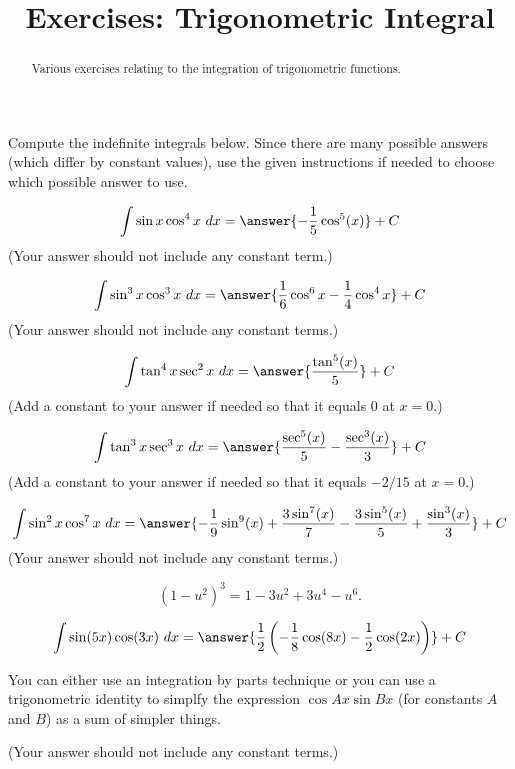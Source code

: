 \documentclass{ximera}
\title{Exercises: Trigonometric Integral}
\begin{document}
\begin{abstract}
Various exercises relating to the integration of trigonometric functions.
\end{abstract}
\maketitle


Compute the indefinite integrals below. Since there are many possible answers (which differ by constant values), use the given instructions if needed to choose which possible answer to use.

\begin{exercise}%
\[  \int \sin x\cos^4x\ dx = \answer{-\frac{1}{5} \cos ^5(x)}+C\]
(Your answer should not include any constant term.)
%
%
\end{exercise}

\begin{exercise}%
\[ \int \sin^3 x\cos^3 x\ dx = \answer{\frac{1}{6}\cos^6x-\frac{1}{4}\cos^4x}+C\]
(Your answer should not include any constant terms.)
%
%
\end{exercise}

\begin{exercise}%
\[ \int \tan^4x\sec^2x\ dx = \answer{\frac{\tan ^5(x)}{5}}+ C\]
(Add a constant to your answer if needed so that it equals $0$ at $x = 0$.)
%
%
\end{exercise}

\begin{exercise}%
\[ \int \tan^3x\sec^3x\ dx = \answer{\frac{\sec ^5(x)}{5}-\frac{\sec ^3(x)}{3}}+ C\]
(Add a constant to your answer if needed so that it equals $-2/15$ at $x = 0$.)
%
%
\end{exercise}

\begin{exercise}%
\[ \int \sin^2 x\cos^7 x\ dx = \answer{-\frac{1}{9} \sin ^{9}(x)+\frac{3 \sin^7(x)}{7}-\frac{3\sin ^5(x)}{5}+\frac{\sin ^3(x)}{3}}+ C\]
(Your answer should not include any constant terms.)
\begin{hint}
\[ (1-u^2)^3 = 1 - 3 u^2 + 3 u^4 - u^6. \]
\end{hint}
%
%
\end{exercise}

\begin{exercise}%
\[ \int \sin(5x)\cos(3x)\ dx = \answer{\frac{1}{2}\left(-\frac{1}{8}\cos(8x)-\frac{1}{2}\cos(2x)\right)}+ C\]
\begin{hint}
You can either use an integration by parts technique or you can use a trigonometric identity to simplfy the expression $\cos Ax \sin Bx$ (for constants $A$ and $B$) as a sum of simpler things.
\end{hint}
(Your answer should not include any constant terms.)
%
%
\end{exercise}
\end{document}
